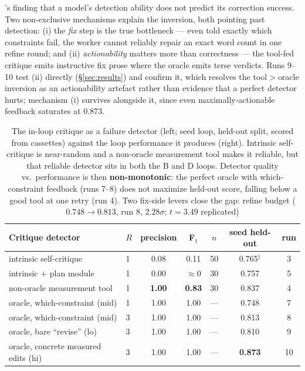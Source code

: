 \documentclass[11pt]{article}
\begin{document}
\citet{decomposing2026selfcorrection}'s finding that a model's detection ability does not
predict its correction success. Two non-exclusive mechanisms explain the inversion,
both pointing past detection: (i) the \emph{fix} step is the true bottleneck ---
even told exactly which constraints fail, the worker cannot reliably repair an exact
word count in one refine round; and (ii) \emph{actionability} matters more than
correctness --- the tool-fed critique emits instructive fix prose where the oracle
emits terse verdicts. Runs 9--10 test (ii) directly (\S\ref{sec:results}) and confirm
it, which resolves the tool${>}$oracle inversion as an actionability artefact rather
than evidence that a perfect detector hurts; mechanism (i) survives alongside it,
since even maximally-actionable feedback saturates at $0.873$.

\begin{table}[h]
\centering
\small
\begin{tabular}{llccccc}
\toprule
Critique detector & $R$ & precision & F$_1$ & $n$ & seed held-out & run \\
\midrule
intrinsic self-critique & 1 & 0.08 & 0.11 & 50 & 0.765$^{\dagger}$ & 3 \\
intrinsic $+$ plan module & 1 & 0.00 & $\approx 0$ & 30 & 0.757 & 5 \\
non-oracle measurement tool & 1 & \textbf{1.00} & \textbf{0.83} & 30 & 0.837 & 4 \\
oracle, which-constraint (mid) & 1 & 1.00 & 1.00 & --- & 0.748 & 7 \\
oracle, which-constraint (mid) & 3 & 1.00 & 1.00 & --- & 0.813 & 8 \\
oracle, bare ``revise'' (lo) & 3 & 1.00 & 1.00 & --- & 0.810 & 9 \\
oracle, concrete measured edits (hi) & 3 & 1.00 & 1.00 & --- & \textbf{0.873} & 10 \\
\bottomrule
\end{tabular}
\caption{The in-loop critique as a failure detector (left; seed loop, held-out split, scored
from cassettes) against the loop performance it produces (right). Intrinsic self-critique is
near-random and a non-oracle measurement tool makes it reliable, but that reliable detector
sits in both the B and D loops. Detector quality vs.\ performance is then
\textbf{non-monotonic}: the perfect oracle with which-constraint feedback (runs 7--8) does not
maximize held-out score, falling below a good tool at one retry (run 4). Two fix-side levers
close the gap: refine budget ($0.748\!\to\!0.813$, run 8, $2.28\sigma$; $t = 3.49$ replicated)
}
\end{table}
\end{document}
